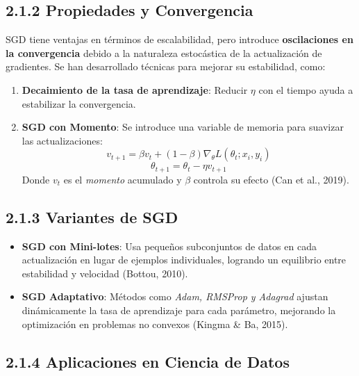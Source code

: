 \documentclass{article}
\begin{document}
     \subsection*{2.1.2 Propiedades y Convergencia}
     
     SGD tiene ventajas en t\'erminos de escalabilidad, pero introduce \textbf{oscilaciones en la convergencia} debido a la naturaleza estoc\'astica de la actualizaci\'on de gradientes. Se han desarrollado t\'ecnicas para mejorar su estabilidad, como:
     
     \begin{enumerate}
     	\item \textbf{Decaimiento de la tasa de aprendizaje}: Reducir $\eta$ con el tiempo ayuda a estabilizar la convergencia.
     	\item \textbf{SGD con Momento}: Se introduce una variable de memoria para suavizar las actualizaciones:
     	\begin{equation}
     		v_{t+1} = \beta v_t + (1 - \beta) \nabla_{\theta} L(\theta_t; x_i, y_i)
     	\end{equation}
     	\begin{equation}
     		\theta_{t+1} = \theta_t - \eta v_{t+1}
     	\end{equation}
     	Donde $v_t$ es el \textit{momento} acumulado y $\beta$ controla su efecto (Can et al., 2019).
     \end{enumerate}
     
     \subsection*{2.1.3 Variantes de SGD}
     
     \begin{itemize}
     	\item \textbf{SGD con Mini-lotes}: Usa peque\~nos subconjuntos de datos en cada actualizaci\'on en lugar de ejemplos individuales, logrando un equilibrio entre estabilidad y velocidad (Bottou, 2010).
     	\item \textbf{SGD Adaptativo}: M\'etodos como \textit{Adam, RMSProp y Adagrad} ajustan din\'amicamente la tasa de aprendizaje para cada par\'ametro, mejorando la optimizaci\'on en problemas no convexos (Kingma \& Ba, 2015).
     \end{itemize}
     
     \subsection*{2.1.4 Aplicaciones en Ciencia de Datos}
     
\end{document}
